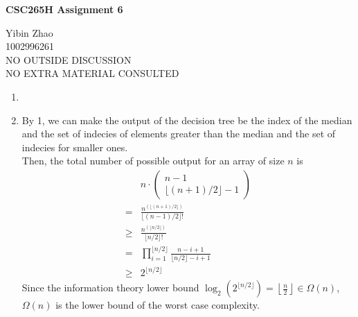\documentclass[10pt]{article}
\begin{document}
\begin{center}
{\bf \Large \bf CSC265H Assignment 6}
\end{center}

\noindent
Yibin Zhao\\
1002996261\\
NO OUTSIDE DISCUSSION\\
NO EXTRA MATERIAL CONSULTED\\

\begin{comment}
The median of a set of numbers is the element with rank $\lfloor (n+1)/2 \rfloor$.
\end{comment}

\begin{enumerate}
	
	\begin{comment}
	Prove that any decesion tree using 2-way comparisons that finds the median of $n$ distinct numbers 
	also determines the set of numbers greater than the median and the set of numbers smaller than the median.
	\end{comment}

	\item

	\begin{comment}
	Prove and $\Omega(n)$ lower bound on the worst case complexity of finding the median of $n$ numbers 
	using the decision tree with 2-way comparisons.
	\end{comment}

	\item By 1, we can make the output of the decision tree be the index of the median and the set of indecies of elements greater than the median and the set of indecies for smaller ones. \\
	Then, the total number of possible output for an array of size $n$ is
	\begin{align*}
		& n \cdot 
		\begin{pmatrix}
			n-1 \\
			\lfloor (n+1)/2 \rfloor - 1
		\end{pmatrix} \\
		=& \frac{n^{(\lfloor (n+1)/2 \rfloor)}}{\lfloor (n-1)/2 \rfloor!} \\
		\geq& \frac{n^{(\lfloor n/2 \rfloor)}}{\lfloor n/2 \rfloor!} \\
		=& \prod_{i=1}^{\lfloor n/2 \rfloor}\frac{n-i+1}{\lfloor n/2 \rfloor -i+1} \\
		\geq& 2^{\lfloor n/2 \rfloor}
	\end{align*}
	Since the information theory lower bound $\log_2(2^{\lfloor n/2 \rfloor}) = \left\lfloor \frac{n}{2} \right\rfloor \in \Omega(n)$, 
	$\Omega(n)$ is the lower bound of the worst case complexity.

\end{enumerate}
\end{document}
